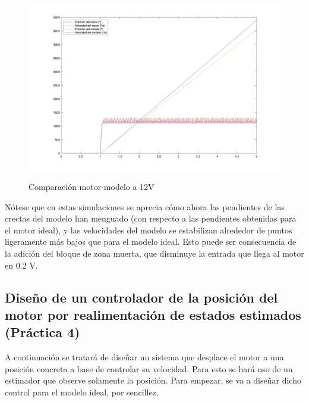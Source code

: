 \documentclass[a4paper, 12pt]{article}
\begin{document}
\begin{figure}[H]
	\centering
	\includegraphics[height=8cm]{figs/p3/encodersmotormodelo12V}
	\caption{Comparación motor-modelo a 12V}  \label{compreal12}
\end{figure} 
Nótese que en estas simulaciones se aprecia cómo ahora las pendientes de las crectas del modelo han menguado (con respecto a las pendientes obtenidas para el motor ideal), y las velocidades del modelo se estabilizan alrededor de puntos ligeramente más bajos que para el modelo ideal. Esto puede ser consecuencia de la adición del bloque de zona muerta, que disminuye la entrada que llega al motor en 0.2 V. 

\subsection{Diseño de un controlador de la posición del motor por realimentación de estados estimados (Práctica 4)}
A continuación se tratará de diseñar un sistema que desplace el motor a una posición concreta a base de controlar su velocidad. Para esto se hará uso de un estimador que observe solamente la posición. Para empezar, se va a diseñar dicho control para el modelo ideal, por sencillez. \\
\end{document}
